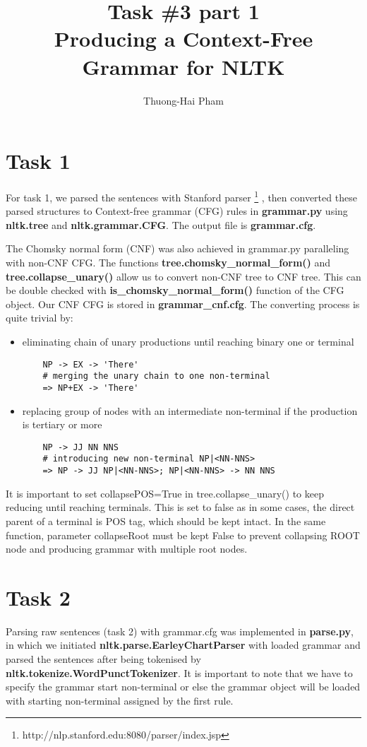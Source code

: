 \documentclass[12pt]{article}
\title{Task \#3 part 1\\Producing a Context-Free Grammar for NLTK}
\author{Thuong-Hai Pham}
\begin{document}
\maketitle

\section{Task 1}
For task 1, we parsed the sentences with Stanford parser \footnote{http://nlp.stanford.edu:8080/parser/index.jsp} \cite{klein2003accurate}, then converted these parsed structures to Context-free grammar (CFG) rules in \textbf{grammar.py} using \textbf{nltk.tree} and \textbf{nltk.grammar.CFG}\cite{bird2009natural}. The output file is \textbf{grammar.cfg}. 

The Chomsky normal form (CNF) was also achieved in grammar.py paralleling with non-CNF CFG. The functions \textbf{tree.chomsky\_normal\_form()} and \textbf{tree.collapse\_unary()} allow us to convert non-CNF tree to CNF tree. This can be double checked with \textbf{is\_chomsky\_normal\_form()} function of the CFG object. Our CNF CFG is stored in \textbf{grammar\_cnf.cfg}. The converting process is quite trivial by:
\begin{itemize}
	\item eliminating chain of unary productions until reaching binary one or terminal
	\begin{verbatim}
	NP -> EX -> 'There'
	# merging the unary chain to one non-terminal
	=> NP+EX -> 'There'
	\end{verbatim}
	\item replacing group of nodes with an intermediate non-terminal if the production is tertiary or more
	\begin{verbatim}
	NP -> JJ NN NNS
	# introducing new non-terminal NP|<NN-NNS>
	=> NP -> JJ NP|<NN-NNS>; NP|<NN-NNS> -> NN NNS
	\end{verbatim}
\end{itemize}

It is important to set collapsePOS=True in tree.collapse\_unary() to keep reducing until reaching terminals. This is set to false as in some cases, the direct parent of a terminal is POS tag, which should be kept intact. In the same function, parameter collapseRoot must be kept False to prevent collapsing ROOT node and producing grammar with multiple root nodes.

\section{Task 2}
Parsing raw sentences (task 2) with grammar.cfg was implemented in \textbf{parse.py}, in which we initiated \textbf{nltk.parse.EarleyChartParser} with loaded grammar and parsed the sentences after being tokenised by \textbf{nltk.tokenize.WordPunctTokenizer}. It is important to note that we have to specify the grammar start non-terminal  or else the grammar object will be loaded with starting non-terminal assigned by the first rule.



\end{document}
